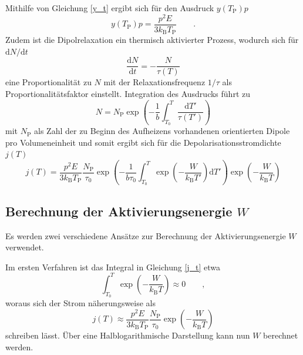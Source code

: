 Mithilfe von Gleichung \eqref{y_t} ergibt sich für den Ausdruck $y(T_\mathrm{P}) p$
\begin{equation}
    y(T_\mathrm{P}) p = \frac{p^2 E}{3 k_\mathrm{B} T_\mathrm{P}} \qquad .
\end{equation}
Zudem ist die Dipolrelaxation ein thermisch aktivierter Prozess, wodurch sich für $\mathrm{d}N/\mathrm{d}t$ 
\begin{equation}
    \frac{\mathrm{d}N}{\mathrm{d}t} = -\frac{N}{\tau(T)}
\end{equation}
eine Proportionalität zu $N$ mit der Relaxationsfrequenz $1/\tau$ als Proportionalitätsfaktor einstellt.
Integration des Ausdrucks führt zu 
\begin{equation*}
    N = N_\mathrm{P} \exp{ \left( - \frac{ 1 }{ b } \int_{T_0}^T \frac{ \mathrm{d}T' }{ \tau(T') } \right )}
\end{equation*}
mit $N_\mathrm{P}$ als Zahl der zu Beginn des Aufheizens vorhandenen orientierten Dipole pro Volumeneinheit
und somit ergibt sich für die Depolarisationsstromdichte $j(T)$
\begin{equation}
    j(T) = \frac{ p^2 E }{ 3 k_\mathrm{B} T_\mathrm{P} } \frac{ N_\mathrm{P} }{ \tau_0 } \exp{ \left( - \frac{ 1 }{ b \tau_0 } \int_{T_0}^T \exp{ \left( - \frac{ W }{ k_\mathrm{B} T' } \right) \mathrm{d}T' } \right) } \exp{ \left( -\frac{ W }{ k_\mathrm{B} T } \right) } \label{j_t}
\end{equation}

\subsection{Berechnung der Aktivierungsenergie $W$} %
\label{sub:berechnung_der_aktivierungsenergie_w_}

Es werden zwei verschiedene Ansätze zur Berechnung der Aktivierungsenergie $W$ verwendet.

Im ersten Verfahren ist das Integral in Gleichung \eqref{j_t} etwa
\begin{equation*}
    \int_{T_0}^T \exp{ \left( - \frac{ W }{ k_\mathrm{B} T } \right )} \approx 0 \qquad , 
\end{equation*}
woraus sich der Strom näherungsweise als
\begin{equation}
    \label{eqn:approx}
    j(T) \approx \frac{ p^2 E }{ 3 k_\mathrm{B} T_\mathrm{P} } \frac{ N_\mathrm{P} }{ \tau_0 } \exp{ \left( - \frac{ W }{ k_\mathrm{B} T} \right ) }
\end{equation}
schreiben lässt.
Über eine Halblogarithmische Darstellung kann nun $W$ berechnet werden.

